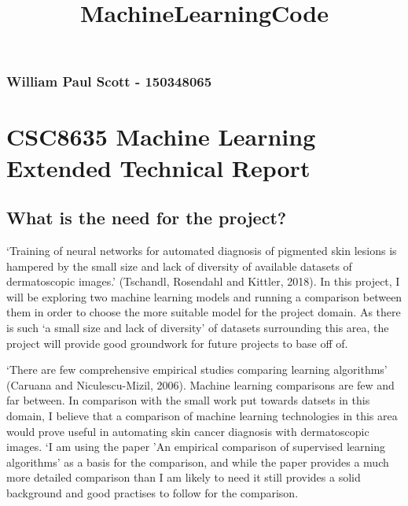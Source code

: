 \documentclass[11pt]{article}
\title{MachineLearningCode}
\begin{document}
    
    
    \maketitle
    
    

    
    \hypertarget{william-paul-scott---150348065}{%
\subsubsection{William Paul Scott -
150348065}\label{william-paul-scott---150348065}}

\hypertarget{csc8635-machine-learning-extended-technical-report}{%
\section{CSC8635 Machine Learning Extended Technical
Report}\label{csc8635-machine-learning-extended-technical-report}}

\hypertarget{what-is-the-need-for-the-project}{%
\subsection{What is the need for the
project?}\label{what-is-the-need-for-the-project}}

`Training of neural networks for automated diagnosis of pigmented skin
lesions is hampered by the small size and lack of diversity of available
datasets of dermatoscopic images.' (Tschandl, Rosendahl and Kittler,
2018). In this project, I will be exploring two machine learning models
and running a comparison between them in order to choose the more
suitable model for the project domain. As there is such `a small size
and lack of diversity' of datasets surrounding this area, the project
will provide good groundwork for future projects to base off of.

`There are few comprehensive empirical studies comparing learning
algorithms' (Caruana and Niculescu-Mizil, 2006). Machine learning
comparisons are few and far between. In comparison with the small work
put towards datsets in this domain, I believe that a comparison of
machine learning technologies in this area would prove useful in
automating skin cancer diagnosis with dermatoscopic images. `I am using
the paper 'An empirical comparison of supervised learning algorithms' as
a basis for the comparison, and while the paper provides a much more
detailed comparison than I am likely to need it still provides a solid
background and good practises to follow for the comparison.
\end{document}
